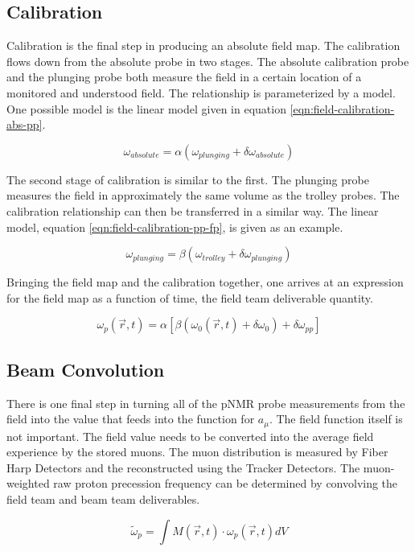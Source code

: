 \subsection{Calibration}

Calibration is the final step in producing an absolute field map.  The calibration flows down from the absolute probe in two stages.  The absolute calibration probe and the plunging probe both measure the field in a certain location of a monitored and understood field.  The relationship is parameterized by a model.  One possible model is the linear model given in equation \ref{eqn:field-calibration-abs-pp}.

\begin{equation}
\label{eqn:field-calibration-abs-pp}
\omega_{absolute} = \alpha(\omega_{plunging} + \delta \omega_{absolute})
\end{equation}

The second stage of calibration is similar to the first.  The plunging probe measures the field in approximately the same volume as the trolley probes.  The calibration relationship can then be transferred in a similar way.  The linear model, equation \ref{eqn:field-calibration-pp-fp}, is given as an example.

\begin{equation}
\label{eqn:field-calibration-pp-fp}
\omega_{plunging} = \beta(\omega_{trolley} + \delta \omega_{plunging})
\end{equation}

Bringing the field map and the calibration together, one arrives at an expression for the field map as a function of time, the field team deliverable quantity.

\begin{equation}
\label{eqn:field-omega-p}
\omega_p(\vec{r}, t) = \alpha 
\left[ 
\beta (\omega_0(\vec{r}, t) + \delta \omega_0) + \delta \omega_{pp}
\right]
\end{equation}

\subsection{Beam Convolution}

There is one final step in turning all of the pNMR probe measurements from the field into the value that feeds into the function for $a_\mu$.  The field function itself is not important.  The field value needs to be converted into the average field experience by the stored muons.  The muon distribution is measured by Fiber Harp Detectors and the reconstructed using the Tracker Detectors\cite{e989-tdr}.  The muon-weighted raw proton precession frequency can be determined by convolving the field team and beam team deliverables.

\begin{equation}
\label{eqn:field-omega-p-tilde}
\tilde{\omega}_p = \int M(\vec{r}, t) \cdot \omega_p(\vec{r}, t) dV
\end{equation}
